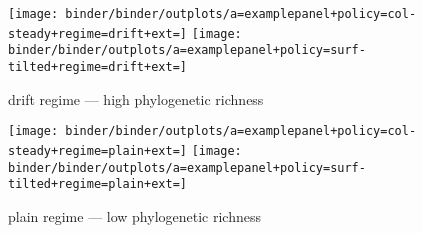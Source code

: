 
\begin{figure*}
  \centering

\begin{subfigure}[b]{\textwidth}
\centering
\texttt{[image: binder/binder/outplots/a=examplepanel+policy=col-steady+regime=drift+ext=]}%
\texttt{[image: binder/binder/outplots/a=examplepanel+policy=surf-tilted+regime=drift+ext=]}
\caption{drift regime --- high phylogenetic richness}
\label{fig:examplepanel-drift}
\end{subfigure}

\begin{subfigure}[b]{\textwidth}
\centering
\texttt{[image: binder/binder/outplots/a=examplepanel+policy=col-steady+regime=plain+ext=]}%
\texttt{[image: binder/binder/outplots/a=examplepanel+policy=surf-tilted+regime=plain+ext=]}
\caption{plain regime --- low phylogenetic richness}
\label{fig:examplepanel-plain}
\end{subfigure}

  \caption{%
  \textbf{Reconstruction vs. Reference Examples.}
  Comparison of reconstruction to reference tree for steady and tilted policies under drift (\ref{fig:examplepanel-drift}) and plain (\ref{fig:examplepanel-plain}) evolutionary regimes.
  Panel tops show reconstruction quality metrics and panel bottoms overlay reconstruction (blue) on reference tree (orange). 
  Phylogeny time axes are log scale.
  Note that overlay layout is naive, so can underrepresent agreement between trees; however, comparison is informative to general differences in tree structure.
  }
  \label{fig:examplepanel}

\end{figure*}
